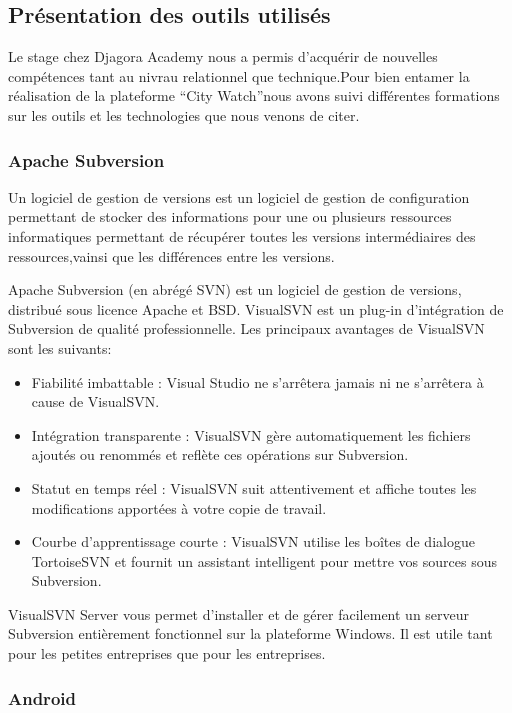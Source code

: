 \subsection{Présentation des outils utilisés}

Le stage chez Djagora Academy nous a permis d'acquérir de nouvelles
compétences tant au nivrau relationnel que technique.Pour bien entamer la réalisation
de la plateforme 
``City Watch''nous avons suivi différentes
formations sur les outils et les technologies que nous venons de citer. 

\subsubsection{Apache Subversion}

Un logiciel de gestion de versions est un logiciel de gestion de configuration
permettant de stocker des informations pour une ou plusieurs ressources
informatiques permettant de récupérer toutes les versions intermédiaires des
ressources,vainsi que les différences entre les versions.

Apache Subversion (en abrégé SVN) est un logiciel de gestion de versions,
distribué sous licence Apache et BSD.
VisualSVN est un plug-in d’intégration de Subversion de qualité professionnelle.
Les principaux avantages de VisualSVN sont les suivants:

\begin{itemize}
    \item Fiabilité imbattable : Visual Studio ne s’arrêtera jamais ni ne
        s’arrêtera à cause de VisualSVN.
    \item Intégration transparente : VisualSVN gère automatiquement les fichiers
        ajoutés ou renommés et reflète ces opérations sur Subversion.
    \item Statut en temps réel : VisualSVN suit attentivement et affiche toutes
        les modifications apportées à votre copie de travail.
    \item Courbe d’apprentissage courte : VisualSVN utilise les boîtes de
        dialogue TortoiseSVN et fournit un assistant intelligent pour mettre
        vos sources sous Subversion.
\end{itemize}
VisualSVN Server vous permet d’installer et de gérer facilement un serveur
Subversion entièrement fonctionnel sur la plateforme Windows. Il est utile tant
pour les petites entreprises que pour les entreprises.

\subsubsection{Android}

